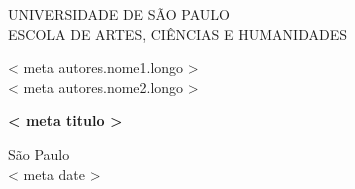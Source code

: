 

\begin{center}

\large

UNIVERSIDADE DE SÃO PAULO\\
ESCOLA DE ARTES, CIÊNCIAS E HUMANIDADES

\vfill

{{< meta autores.nome1.longo >}} \\
{{< meta autores.nome2.longo >}}

\vfill

\textbf{ {{< meta titulo >}} }

\vfill

\quad

\vfill

São Paulo\\
{{< meta date >}}

\end{center}

\newpage

